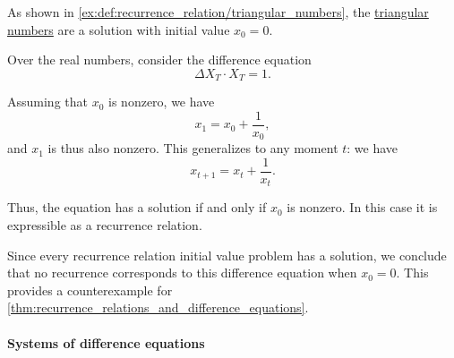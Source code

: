 \begin{example}
\begin{thmenum}
    As shown in \cref{ex:def:recurrence_relation/triangular_numbers}, the \hyperref[def:triangular_number/arithmetic]{triangular numbers} are a solution with initial value \( x_0 = 0 \).

     Over the real numbers, consider the difference equation
    \begin{equation*}
      \Delta X_T \cdot X_T = 1.
    \end{equation*}

    Assuming that \( x_0 \) is nonzero, we have
    \begin{equation*}
      x_1 = x_0 + \frac 1 {x_0},
    \end{equation*}
    and \( x_1 \) is thus also nonzero. This generalizes to any moment \( t \): we have
    \begin{equation*}
      x_{t+1} = x_t + \frac 1 {x_t}.
    \end{equation*}

    Thus, the equation has a solution if and only if \( x_0 \) is nonzero. In this case it is expressible as a recurrence relation.

    Since every recurrence relation initial value problem has a solution, we conclude that no recurrence corresponds to this difference equation when \( x_0 = 0 \). This provides a counterexample for \cref{thm:recurrence_relations_and_difference_equations}.
  \end{thmenum}
\end{example}

\paragraph{Systems of difference equations}

